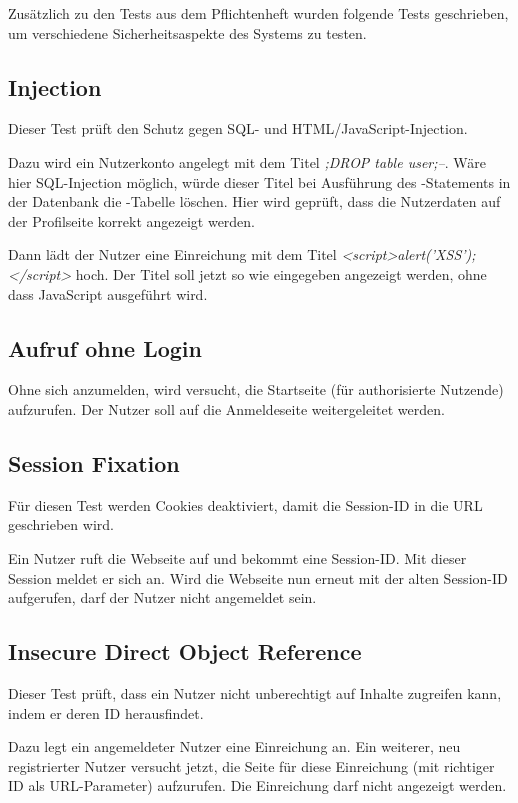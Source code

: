 
Zusätzlich zu den Tests aus dem Pflichtenheft wurden folgende Tests geschrieben,
um verschiedene Sicherheitsaspekte des Systems zu testen.

\subsection{Injection}\label{subsec:injection-test}
Dieser Test prüft den Schutz gegen SQL- und HTML/JavaScript-Injection.

Dazu wird ein Nutzerkonto angelegt mit dem Titel \emph{;DROP table user;--}.
Wäre hier SQL-Injection möglich, würde dieser Titel bei Ausführung des -Statements in der Datenbank
die -Tabelle löschen.
Hier wird geprüft, dass die Nutzerdaten auf der Profilseite korrekt angezeigt werden.

Dann lädt der Nutzer eine Einreichung mit dem Titel \emph{<script>alert('XSS');</script>} hoch.
Der Titel soll jetzt so wie eingegeben angezeigt werden, ohne dass JavaScript ausgeführt wird.

\subsection{Aufruf ohne Login}\label{subsec:unauthorized-test}
Ohne sich anzumelden, wird versucht, die Startseite (für authorisierte Nutzende) aufzurufen.
Der Nutzer soll auf die Anmeldeseite weitergeleitet werden.

\subsection{Session Fixation}\label{subsec:session-fixation-test}
Für diesen Test werden Cookies deaktiviert, damit die Session-ID in die URL geschrieben wird.

Ein Nutzer ruft die Webseite auf und bekommt eine Session-ID\@.
Mit dieser Session meldet er sich an.
Wird die Webseite nun erneut mit der alten Session-ID aufgerufen, darf der Nutzer nicht angemeldet sein.

\subsection{Insecure Direct Object Reference}\label{subsec:idor-test}
Dieser Test prüft, dass ein Nutzer nicht unberechtigt auf Inhalte zugreifen kann, indem er deren ID herausfindet.

Dazu legt ein angemeldeter Nutzer eine Einreichung an.
Ein weiterer, neu registrierter Nutzer versucht jetzt,
die Seite für diese Einreichung (mit richtiger ID als URL-Parameter) aufzurufen.
Die Einreichung darf nicht angezeigt werden.
